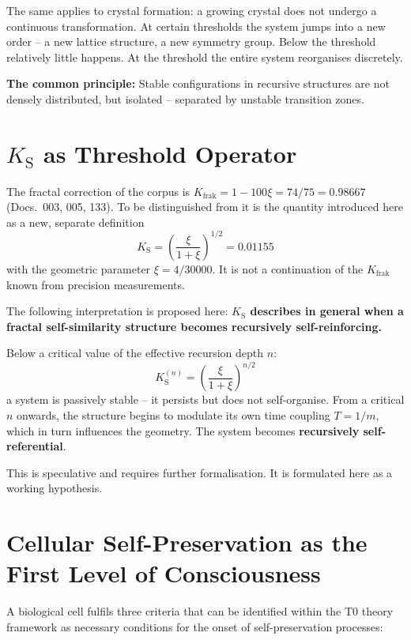 	The same applies to crystal formation: a growing crystal does not undergo a continuous transformation. At certain thresholds the system jumps into a new order -- a new lattice structure, a new symmetry group. Below the threshold relatively little happens. At the threshold the entire system reorganises discretely.
	
	\textbf{The common principle:} Stable configurations in recursive structures are not densely distributed, but isolated -- separated by unstable transition zones.
	
	\section{$K_{\text{S}}$ as Threshold Operator}
	
	The fractal correction of the corpus is $K_{\text{frak}} = 1 - 100\xi = 74/75 = 0.98667$ (Docs.~003, 005, 133). To be distinguished from it is the quantity introduced here as a new, separate definition
	\begin{equation}
		K_{\text{S}} = \left(\frac{\xi}{1+\xi}\right)^{1/2} = 0.01155
	\end{equation}
	with the geometric parameter $\xi = 4/30000$. It is not a continuation of the $K_{\text{frak}}$ known from precision measurements.
	
	The following interpretation is proposed here: \textbf{$K_{\text{S}}$ describes in general when a fractal self-similarity structure becomes recursively self-reinforcing.}
	
	Below a critical value of the effective recursion depth $n$:
	\begin{equation}
		K_{\text{S}}^{(n)} = \left(\frac{\xi}{1+\xi}\right)^{n/2}
	\end{equation}
	a system is passively stable -- it persists but does not self-organise. From a critical $n$ onwards, the structure begins to modulate its own time coupling $T = 1/m$, which in turn influences the geometry. The system becomes \textbf{recursively self-referential}.
	
	This is speculative and requires further formalisation. It is formulated here as a working hypothesis.
	
	\section{Cellular Self-Preservation as the First Level of Consciousness}
	
	A biological cell fulfils three criteria that can be identified within the T0 theory framework as necessary conditions for the onset of self-preservation processes:
	

